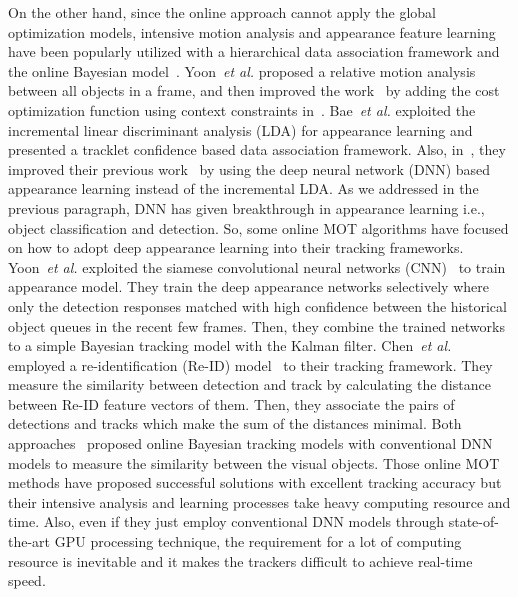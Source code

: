 \documentclass[journal]{IEEEtran}
\newcounter{ct}
\begin{document}
On the other hand, since the online approach cannot apply the global optimization models, intensive motion analysis and appearance feature learning have been popularly utilized with a hierarchical data association framework and the online Bayesian model~\cite{rmot,scea,bae1,bae2,ham,motdt,gmphdkcf,fu1}.
Yoon~\textit{et al.}\cite{rmot} proposed a relative motion analysis between all objects in a frame, and then improved the work~\cite{rmot} by adding the cost optimization function using context constraints in~\cite{scea}.
Bae~\textit{et al.}\cite{bae1} exploited the incremental linear discriminant analysis (LDA) for appearance learning and presented a tracklet confidence based data association framework. Also, in~\cite{bae2}, they improved their previous work~\cite{bae1} by using the deep neural network (DNN) based appearance learning instead of the incremental LDA. As we addressed in the previous paragraph, DNN has given breakthrough in appearance learning i.e., object classification and detection. 
So, some online MOT algorithms have focused on how to adopt deep appearance learning into their tracking frameworks. 
Yoon~\textit{et al.}\cite{ham} exploited the siamese convolutional neural networks (CNN)~\cite{siamese} to train appearance model. They train the deep appearance networks selectively where only the detection responses matched with high confidence between the historical object queues in the recent few frames. Then, they combine the trained networks to a simple Bayesian tracking model with the Kalman filter. Chen~\textit{et al.}\cite{motdt} employed a re-identification (Re-ID) model~\cite{reid} to their tracking framework. They measure the similarity between detection and track by calculating the distance between Re-ID feature vectors of them. Then, they associate the pairs of detections and tracks which make the sum of the distances minimal.
Both approaches~\cite{ham,motdt} proposed online Bayesian tracking models with conventional DNN models to measure the similarity between the visual objects.
Those online MOT methods have proposed successful solutions with excellent tracking accuracy but their intensive analysis and learning processes take heavy computing resource and time. Also, even if they just employ conventional DNN models through state-of-the-art GPU processing technique, the requirement for a lot of computing resource is inevitable and it makes the trackers difficult to achieve real-time speed.
\end{document}
